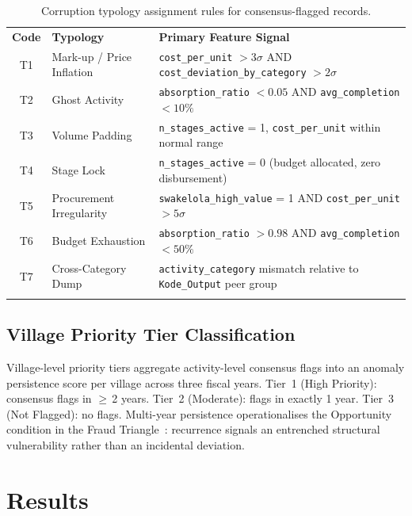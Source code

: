 \documentclass[3p,times,procedia]{elsarticle}
\begin{document}
\begin{table}[htb]
\caption{Corruption typology assignment rules for consensus-flagged records.}
\label{tab:typo_rules}
\begin{tabular*}{\hsize}{@{\extracolsep{\fill}}cll@{}}
\toprule
\textbf{Code} & \textbf{Typology} & \textbf{Primary Feature Signal} \\
\colrule
T1 & Mark-up / Price Inflation   & \texttt{cost\_per\_unit} $> 3\sigma$ AND \texttt{cost\_deviation\_by\_category} $> 2\sigma$ \\
T2 & Ghost Activity              & \texttt{absorption\_ratio} $< 0.05$ AND \texttt{avg\_completion} $< 10\%$ \\
T3 & Volume Padding              & \texttt{n\_stages\_active} = 1, \texttt{cost\_per\_unit} within normal range \\
T4 & Stage Lock                  & \texttt{n\_stages\_active} = 0 (budget allocated, zero disbursement) \\
T5 & Procurement Irregularity    & \texttt{swakelola\_high\_value} = 1 AND \texttt{cost\_per\_unit} $> 5\sigma$ \\
T6 & Budget Exhaustion           & \texttt{absorption\_ratio} $> 0.98$ AND \texttt{avg\_completion} $< 50\%$ \\
T7 & Cross-Category Dump         & \texttt{activity\_category} mismatch relative to \texttt{Kode\_Output} peer group \\
\botrule
\end{tabular*}
\end{table}

\subsection{Village Priority Tier Classification}

Village-level priority tiers aggregate activity-level consensus flags into an anomaly persistence score per village across three fiscal years. Tier~1 (High Priority): consensus flags in $\geq$\,2 years. Tier~2 (Moderate): flags in exactly 1 year. Tier~3 (Not Flagged): no flags. Multi-year persistence operationalises the Opportunity condition in the Fraud Triangle~\cite{ref17}: recurrence signals an entrenched structural vulnerability rather than an incidental deviation.

\section{Results}
\label{sec:results}
\end{document}
